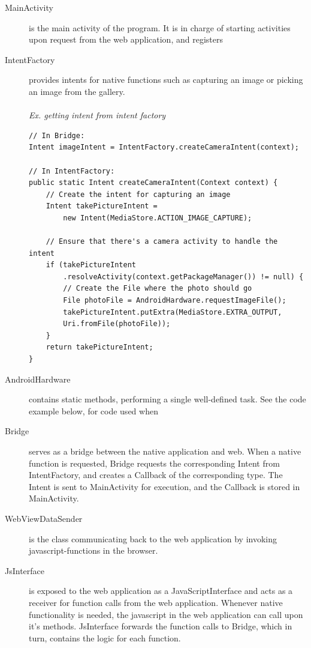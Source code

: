 \begin{description}
	\item[MainActivity] is the main activity of the program. It is in charge of starting activities upon request from the web application, and registers 
	
	
	\item[IntentFactory] provides intents for native functions such as capturing an image or picking an image from the gallery. 
	\\\\
	\emph{Ex. getting intent from intent factory}
	
	\begin{lstlisting}
// In Bridge:
Intent imageIntent = IntentFactory.createCameraIntent(context);
		
// In IntentFactory:
public static Intent createCameraIntent(Context context) {
	// Create the intent for capturing an image
	Intent takePictureIntent = 
		new Intent(MediaStore.ACTION_IMAGE_CAPTURE);
	
	// Ensure that there's a camera activity to handle the intent
	if (takePictureIntent
		.resolveActivity(context.getPackageManager()) != null) {
		// Create the File where the photo should go
		File photoFile = AndroidHardware.requestImageFile();
		takePictureIntent.putExtra(MediaStore.EXTRA_OUTPUT,
		Uri.fromFile(photoFile));
	}
	return takePictureIntent;
}
\end{lstlisting}
	
	\item[AndroidHardware] contains static methods, performing a single well-defined task. See the code example below, for code used when 
	
	\item[Bridge] serves as a bridge between the native application and web. When a native function is requested, Bridge requests the corresponding Intent from IntentFactory, and creates a Callback of the corresponding type. The Intent is sent to MainActivity for execution, and the Callback is stored in MainActivity.
	
	\item[WebViewDataSender] is the class communicating back to the web application by invoking javascript-functions in the browser.
	
	\item[JsInterface] is exposed to the web application as a JavaScriptInterface and acts as a receiver for function calls from the web application. Whenever native functionality is needed, the javascript in the web application can call upon it's methods. JsInterface forwards the function calls to Bridge, which in turn, contains the logic for each function.
	

\end{description}
